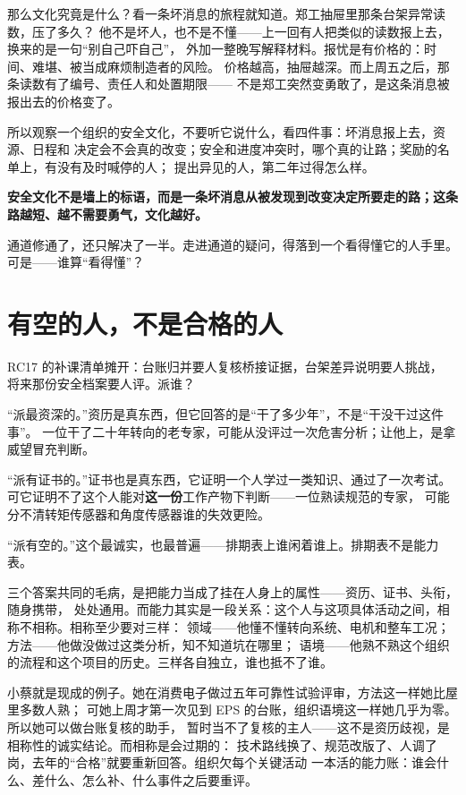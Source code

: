 那么文化究竟是什么？看一条坏消息的旅程就知道。郑工抽屉里那条台架异常读数，压了多久？
他不是坏人，也不是不懂——上一回有人把类似的读数报上去，换来的是一句“别自己吓自己”，
外加一整晚写解释材料。报忧是有价格的：时间、难堪、被当成麻烦制造者的风险。
价格越高，抽屉越深。而上周五之后，那条读数有了编号、责任人和处置期限——
不是郑工突然变勇敢了，是这条消息被报出去的价格变了。

所以观察一个组织的安全文化，不要听它说什么，看四件事：坏消息报上去，资源、日程和
决定会不会真的改变；安全和进度冲突时，哪个真的让路；奖励的名单上，有没有及时喊停的人；
提出异见的人，第二年过得怎么样。

\textbf{安全文化不是墙上的标语，而是一条坏消息从被发现到改变决定所要走的路；这条路越短、越不需要勇气，文化越好。}

通道修通了，还只解决了一半。走进通道的疑问，得落到一个看得懂它的人手里。
可是——谁算“看得懂”？

\section{有空的人，不是合格的人}

RC17 的补课清单摊开：台账归并要人复核桥接证据，台架差异说明要人挑战，
将来那份安全档案要人评。派谁？

“派最资深的。”资历是真东西，但它回答的是“干了多少年”，不是“干没干过这件事”。
一位干了二十年转向的老专家，可能从没评过一次危害分析；让他上，是拿威望冒充判断。

“派有证书的。”证书也是真东西，它证明一个人学过一类知识、通过了一次考试。
可它证明不了这个人能对\textbf{这一份}工作产物下判断——一位熟读规范的专家，
可能分不清转矩传感器和角度传感器谁的失效更险。

“派有空的。”这个最诚实，也最普遍——排期表上谁闲着谁上。排期表不是能力表。

三个答案共同的毛病，是把能力当成了挂在人身上的属性——资历、证书、头衔，随身携带，
处处通用。而能力其实是一段关系：这个人与这项具体活动之间，相称不相称。相称至少要对三样：
领域——他懂不懂转向系统、电机和整车工况；方法——他做没做过这类分析，知不知道坑在哪里；
语境——他熟不熟这个组织的流程和这个项目的历史。三样各自独立，谁也抵不了谁。

小蔡就是现成的例子。她在消费电子做过五年可靠性试验评审，方法这一样她比屋里多数人熟；
可她上周才第一次见到 EPS 的台账，组织语境这一样她几乎为零。所以她可以做台账复核的助手，
暂时当不了复核的主人——这不是资历歧视，是相称性的诚实结论。而相称是会过期的：
技术路线换了、规范改版了、人调了岗，去年的“合格”就要重新回答。组织欠每个关键活动
一本活的能力账：谁会什么、差什么、怎么补、什么事件之后要重评。

